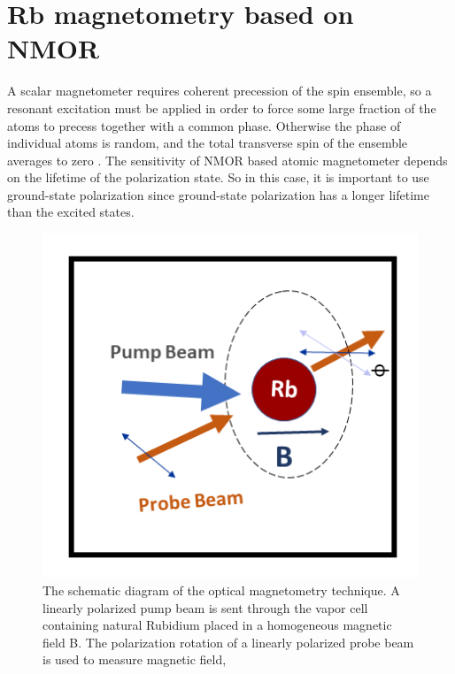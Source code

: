 \section{Rb magnetometry based on NMOR}

A scalar magnetometer requires coherent precession of the spin ensemble, so a resonant excitation must be applied in order to force some large fraction of the atoms to precess together with a common phase. Otherwise the phase of individual atoms is random, and the total transverse spin of the ensemble averages to zero \cite{budker2013optical} . The sensitivity of NMOR based atomic magnetometer depends on the lifetime of the polarization state. So in this case, it is important to use ground-state polarization since ground-state polarization has a longer lifetime than the excited states. 
\begin{figure}[h]
\centering
\includegraphics[width=0.55\linewidth]{figures/optical_pumping}
\caption{The schematic diagram of the optical magnetometry technique.
  A linearly polarized pump beam is sent through the vapor cell
  containing natural Rubidium placed in a homogeneous magnetic field
  B.  The polarization rotation of a linearly polarized probe beam is
  used to measure magnetic field,\label{Rb magnetometry}}
\end{figure}


